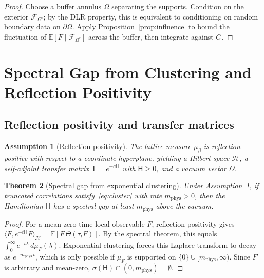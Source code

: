 \documentclass[11pt]{article}
\newtheorem{theorem}{Theorem}[section]
\newtheorem{assumption}[theorem]{Assumption}
\theoremstyle{definition}
\newcommand{\E}{\mathbb{E}}
\newcommand{\1}{\mathbf{1}}
\newcommand{\cH}{\mathcal{H}}
\newcommand{\cF}{\mathcal{F}}
\newcommand{\ip}[2]{\langle #1,#2\rangle}
\begin{document}
\begin{proof}
Choose a buffer annulus $\Omega$ separating the supports.  Condition on the exterior
$\cF_{\Omega^c}$; by the DLR property, this is equivalent to conditioning on random
boundary data on $\partial\Omega$.  Apply Proposition~\ref{prop:influence} to bound
the fluctuation of $\E[F\mid\cF_{\Omega^c}]$ across the buffer, then integrate against $G$.
\end{proof}

\section{Spectral Gap from Clustering and Reflection Positivity}\label{sec:gap}

\subsection{Reflection positivity and transfer matrices}

\begin{assumption}[Reflection positivity]\label{ass:RP}
The lattice measure $\mu_\beta$ is reflection positive with respect to a coordinate
hyperplane, yielding a Hilbert space $\cH$, a self-adjoint transfer matrix
$\mathsf{T}=e^{-a\mathsf{H}}$ with $\mathsf{H}\ge 0$, and a vacuum vector $\Omega$.
\end{assumption}

\begin{theorem}[Spectral gap from exponential clustering]\label{thm:gap}
Under Assumption~\ref{ass:RP}, if truncated correlations satisfy~\eqref{eq:cluster} with
rate $m_{\mathrm{phys}}>0$, then the Hamiltonian $\mathsf{H}$ has a spectral gap at least
$m_{\mathrm{phys}}$ above the vacuum.
\end{theorem}

\begin{proof}
For a mean-zero time-local observable $F$, reflection positivity gives
$\ip{F}{e^{-t\mathsf{H}}F}_\cH=\E[F\,\Theta(\tau_t F)]$.
By the spectral theorem, this equals $\int_0^\infty e^{-t\lambda}\,d\mu_F(\lambda)$.
Exponential clustering forces this Laplace transform to decay as $e^{-m_{\mathrm{phys}}\,t}$,
which is only possible if $\mu_F$ is supported on
$\{0\}\cup[m_{\mathrm{phys}},\infty)$.  Since $F$ is arbitrary and mean-zero,
$\sigma(\mathsf{H})\cap(0,m_{\mathrm{phys}})=\emptyset$.
\end{proof}
\end{document}
